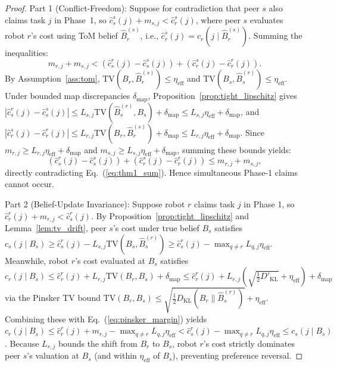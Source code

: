 \documentclass[lettersize,journal]{IEEEtran}
\begin{document}
\begin{proof}
Part 1 (Conflict-Freedom): Suppose for contradiction that peer $s$ also claims task $j$ in Phase~1, so $\hat{c}_s^s(j) + m_{s, j} < \hat{c}_r^s(j)$, where peer $s$ evaluates robot $r$'s cost using ToM belief $\hat{B}_r^{(s)}$, i.e., $\hat{c}_r^s(j) = c_r(j \mid \hat{B}_r^{(s)})$. Summing the inequalities:
\begin{equation}
    m_{r, j} + m_{s, j} < \left( \hat{c}_s^r(j) - \hat{c}_s^s(j) \right) + \left( \hat{c}_r^s(j) - \hat{c}_r^r(j) \right).
\label{eq:thm1_sum}
\end{equation}
By Assumption~\ref{ass:tom}, $\mathrm{TV}(B_r, \hat{B}_r^{(s)}) \le \eta_{\text{eff}}$ and $\mathrm{TV}(B_s, \hat{B}_s^{(r)}) \le \eta_{\text{eff}}$. Under bounded map discrepancies $\delta_{\text{map}}$, Proposition~\ref{prop:tight_lipschitz} gives $|\hat{c}_s^r(j) - \hat{c}_s^s(j)| \le L_{s, j} \mathrm{TV}(\hat{B}_s^{(r)}, B_s) + \delta_{\text{map}} \le L_{s, j} \eta_{\text{eff}} + \delta_{\text{map}}$, and $|\hat{c}_r^s(j) - \hat{c}_r^r(j)| \le L_{r, j} \mathrm{TV}(B_r, \hat{B}_r^{(s)}) + \delta_{\text{map}} \le L_{r, j} \eta_{\text{eff}} + \delta_{\text{map}}$. Since $m_{r, j} \ge L_{r, j} \eta_{\text{eff}} + \delta_{\text{map}}$ and $m_{s, j} \ge L_{s, j} \eta_{\text{eff}} + \delta_{\text{map}}$, summing these bounds yields:
\begin{equation}
    \left( \hat{c}_s^r(j) - \hat{c}_s^s(j) \right) + \left( \hat{c}_r^s(j) - \hat{c}_r^r(j) \right) \le m_{r, j} + m_{s, j},
\end{equation}
directly contradicting Eq.~(\ref{eq:thm1_sum}). Hence simultaneous Phase-1 claims cannot occur.

Part 2 (Belief-Update Invariance): Suppose robot $r$ claims task $j$ in Phase 1, so $\hat{c}_r^r(j) + m_{r, j} < \hat{c}_s^r(j)$. By Proposition~\ref{prop:tight_lipschitz} and Lemma~\ref{lem:tv_drift}, peer $s$'s cost under true belief $B_s$ satisfies $c_s(j \mid B_s) \ge \hat{c}_s^r(j) - L_{s, j}\mathrm{TV}(B_s, \hat{B}_s^{(r)}) \ge \hat{c}_s^r(j) - \max_{q \ne r} L_{q, j}\eta_{\text{eff}}$. Meanwhile, robot $r$'s cost evaluated at $B_s$ satisfies $c_r(j \mid B_s) \le \hat{c}_r^r(j) + L_{r, j}\mathrm{TV}(B_r, B_s) + \delta_{\text{map}} \le \hat{c}_r^r(j) + L_{r, j}(\sqrt{\frac{1}{2}D'_{\text{KL}}} + \eta_{\text{eff}}) + \delta_{\text{map}}$ via the Pinsker TV bound $\mathrm{TV}(B_r, B_s) \le \sqrt{\frac{1}{2} D_{\text{KL}}(B_r \parallel \hat{B}_s^{(r)})} + \eta_{\text{eff}}$. Combining these with Eq.~(\ref{eq:pinsker_margin}) yields $c_r(j \mid B_s) \le \hat{c}_r^r(j) + m_{r, j} - \max_{q \ne r} L_{q, j}\eta_{\text{eff}} < \hat{c}_s^r(j) - \max_{q \ne r} L_{q, j}\eta_{\text{eff}} \le c_s(j \mid B_s)$. Because $L_{r, j}$ bounds the shift from $B_r$ to $B_s$, robot $r$'s cost strictly dominates peer $s$'s valuation at $B_s$ (and within $\eta_{\text{eff}}$ of $B_s$), preventing preference reversal.
\end{proof}
\end{document}
